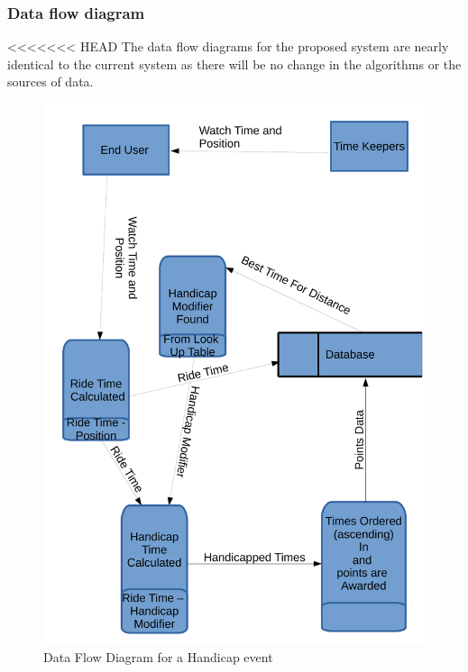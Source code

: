 \subsubsection{Data flow diagram}
<<<<<<< HEAD
The data flow diagrams for the proposed system are nearly identical to the current system as there will be no change in the algorithms or the sources of data.
\begin{figure}[H]
	\includegraphics[width=\textwidth]{./DFDPS.pdf}
	 \caption{Data Flow Diagram for a Handicap event}
\end{figure}


